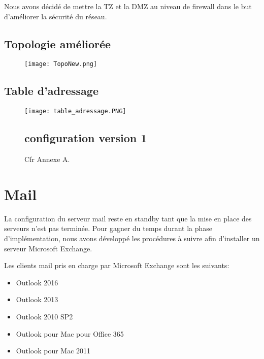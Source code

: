 \documentclass{article}
\begin{document}
     Nous avons décidé de mettre la TZ et la DMZ au niveau de firewall dans le but d'améliorer la sécurité du réseau.
     
    \subsection{Topologie améliorée}
    \begin{figure}[ht]

    \begin{center}
    \texttt{[image: TopoNew.png]} 
    \end{center}
    \end{figure}
    \newpage
    \subsection{Table d'adressage}
    \begin{figure}[ht]
    
    \begin{center}
    \texttt{[image: table\_adressage.PNG]} 
    \end{center}
    \subsection{configuration version 1}
    Cfr Annexe A.
    \end{figure}
    
    

   
\section{Mail}

La configuration du serveur mail reste en standby tant que la mise en place des serveurs n'est pas terminée. Pour gagner du temps durant la phase d'implémentation, nous avons développé les procédures à suivre afin d'installer un serveur Microsoft Exchange.

Les clients mail pris en charge par Microsoft Exchange sont les suivants:

\begin{itemize}
    \item Outlook 2016
    \item Outlook 2013
    \item Outlook 2010 SP2
    \item Outlook pour Mac pour Office 365
    \item Outlook pour Mac 2011
\end{itemize}
\end{document}
